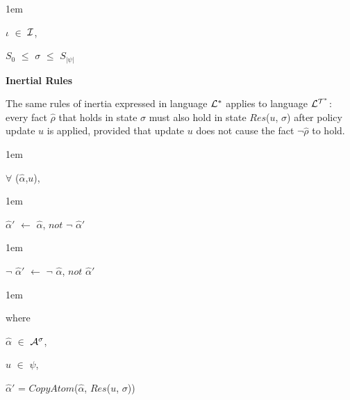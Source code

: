 \documentclass[11pt]{report}
\newenvironment{vquote}
{
  \begin{list}{}{\leftmargin 1em}\item[]
}
{
  \end{list}
}
\begin{document}
\begin{itemize}
\begin{itemize}
\begin{vquote}
                    \hspace{1em}
                    $\iota$ $\in$ ${\cal I}$,

                    \hspace{1em}
                    $S_{0}$ $\leq$ $\sigma$ $\leq$ $S_{|\psi|}$
                  \end{vquote}
              \end{itemize}
            
            \item
              {\bf Inertial Rules}

              The same rules of inertia expressed in language ${\cal L^*}$
              applies to language ${\cal L^{T^*}}$: every fact $\hat{\rho}$
              that holds in state $\sigma$ must also hold in state
              $Res$($u$, $\sigma$) after policy update $u$ is applied,
              provided that update $u$ does not cause the fact
              $\lnot\hat{\rho}$ to hold.

              \begin{vquote}
                $\forall$ ($\hat{\alpha}$,$u$),
              \end{vquote}

              \begin{vquote}
                $\hat{\alpha}'$
                $\leftarrow$
                $\hat{\alpha}$,
                $not$ $\lnot$ $\hat{\alpha}'$
              \end{vquote}

              \begin{vquote}
                $\lnot$ $\hat{\alpha}'$
                $\leftarrow$ $\lnot$
                $\hat{\alpha}$,
                $not$ $\hat{\alpha}'$
              \end{vquote}

              \begin{vquote}
                where

                \hspace{1em}
                $\hat{\alpha}$ $\in$ ${\cal A}^{\sigma}$,

                \hspace{1em}
                $u$ $\in$ $\psi$,

                \hspace{1em}
                $\hat{\alpha}'$ = $CopyAtom$($\hat{\alpha}$, $Res$($u$, $\sigma$))
              \end{vquote}
            

\end{itemize}
\end{document}
